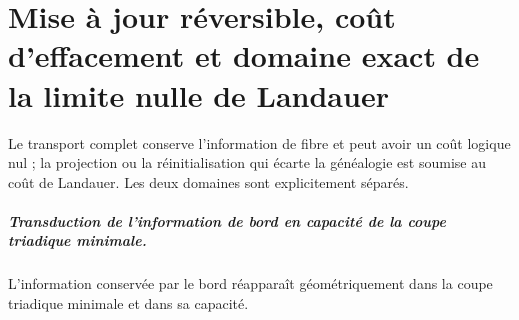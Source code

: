 \chapter{Mise à jour réversible, coût d’effacement et domaine exact de la limite nulle de Landauer}
\label{chap:parte-iv-57}

Le transport complet conserve l’information de fibre et peut avoir un coût logique nul ; la projection ou la réinitialisation qui écarte la généalogie est soumise au coût de Landauer. Les deux domaines sont explicitement séparés.



\paragraph{Transduction de l’information de bord en capacité de la coupe triadique minimale.} L’information conservée par le bord réapparaît géométriquement dans la coupe triadique minimale et dans sa capacité.
